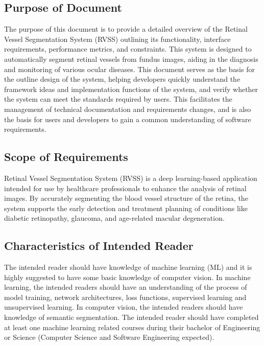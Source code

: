 \documentclass[12pt]{article}
\begin{document}
\subsection{Purpose of Document}

The purpose of this document is to provide a detailed overview of the Retinal Vessel Segmentation System (RVSS) outlining its functionality, interface requirements, performance metrics, and constraints. This system is designed to automatically segment retinal vessels from fundus images, aiding in the diagnosis and monitoring of various ocular diseases. This document serves as the basis for the outline design of the system, helping developers quickly understand the framework ideas and implementation functions of the system, and verify whether the system can meet the standards required by users. This facilitates the management of technical documentation and requirements changes, and is also the basis for users and developers to gain a common understanding of software requirements.



\subsection{Scope of Requirements} 

Retinal Vessel Segmentation System (RVSS) is a deep learning-based application intended for use by healthcare professionals to enhance the analysis of retinal images. By accurately segmenting the blood vessel structure of the retina, the system supports the early detection and treatment planning of conditions like diabetic retinopathy, glaucoma, and age-related macular degeneration. 

\subsection{Characteristics of Intended Reader} \label{sec_IntendedReader}

The intended reader should have knowledge of machine learning (ML) and it is highly suggested to have some basic knowledge of computer vision. In machine learning, the intended readers should have an understanding of the process of model training, network architectures, loss functions, supervised learning and unsupervised learning. In computer vision, the intended readers should have knowledge of semantic segmentation. The intended reader should have completed at least one machine learning related courses during their bachelor of Engineering or Science (Computer Science and Software Engineering expected). 
\end{document}
